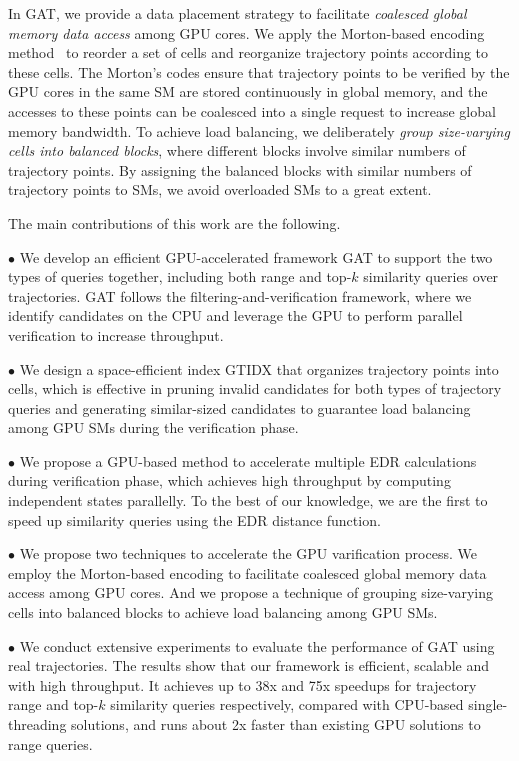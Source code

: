 \documentclass[10pt,conference,letterpaper]{IEEEtran}
\newcommand{\frname}{GAT\xspace }
\newcommand{\idxname}{GTIDX\xspace }
\begin{document}
In \frname, we provide a data placement strategy to facilitate \emph{coalesced global memory data access} among GPU cores.
We apply the Morton-based encoding method~\cite{morton1966computer} to reorder a set of cells and reorganize trajectory points according to these cells.
The Morton's codes ensure that trajectory points to be verified by the GPU cores in the same SM are stored continuously in global memory, and the accesses to these points can be coalesced into a single request to increase global memory bandwidth.
To achieve load balancing, we deliberately \emph{group size-varying cells into balanced blocks}, where different blocks involve similar numbers of trajectory points. By assigning the balanced blocks with similar numbers of trajectory points to SMs, we avoid overloaded SMs to a great extent.


The main contributions of this work are the following.

$\bullet$ We develop an efficient GPU-accelerated framework \frname to support the two types of queries together, including both range and top-$k$ similarity queries over trajectories. \frname follows the filtering-and-verification framework, where we identify candidates on the CPU and leverage the GPU to perform parallel verification to increase throughput.

$\bullet$ We design a space-efficient index \idxname that organizes trajectory points into cells, which is effective in pruning invalid candidates for both types of trajectory queries and generating similar-sized candidates to guarantee load balancing among GPU SMs during the verification phase.

$\bullet$ We propose a GPU-based method to accelerate multiple EDR calculations during verification phase, which achieves high throughput by computing independent states parallelly. To the best of our knowledge, we are the first to speed up similarity queries using the EDR distance function.

$\bullet$ We propose two techniques to accelerate the GPU varification process. We employ the Morton-based encoding to facilitate coalesced global memory data access among GPU cores. And we propose a technique of grouping size-varying cells into balanced blocks to achieve load balancing among GPU SMs.


$\bullet$ We conduct extensive experiments to evaluate the performance of \frname using real trajectories. The results show that
our framework is efficient, scalable and with high throughput. It achieves up to 38x and 75x speedups for trajectory range and top-$k$ similarity queries respectively, compared with CPU-based single-threading solutions, and runs about 2x faster than existing GPU solutions to range queries.
\end{document}
